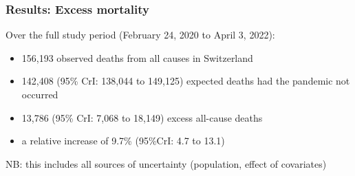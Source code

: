 \documentclass[10pt]{beamer}
\begin{document}
%
%
%
%
%	


\begin{frame}
	\frametitle{Results: Excess mortality}
	Over the full study period (February 24, 2020 to April 3, 2022):
	\begin{itemize}
	\item \alert{156,193 observed deaths} from all causes in Switzerland 
	\item \alert{142,408} (95\% CrI: 138,044 to 149,125) expected deaths had the pandemic not occurred
	\item \alert{13,786} (95\% CrI: 7,068 to 18,149) excess all-cause deaths 
	\item a relative increase of \alert{9.7\%} (95\%CrI: 4.7 to 13.1)
	\end{itemize}
	\bigskip\bigskip
	NB: this includes all sources of uncertainty (population, effect of covariates)
\end{frame}
\end{document}

